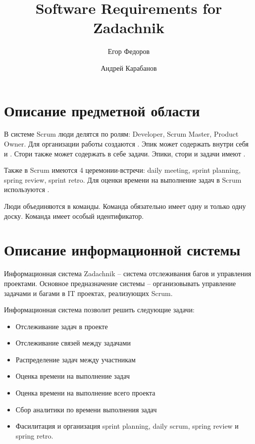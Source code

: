 \documentclass{article}
\author{Егор Федоров \and Андрей Карабанов}
\title{Software Requirements for Zadachnik}
\begin{document}

\tableofcontents

\section{Описание предметной области}
В системе Scrum люди делятся по ролям:
Developer, Scrum Master, Product Owner.
Для организации работы создаются .
Эпик может содержать внутри себя  и
. Стори также может содержать в себе задачи.
Эпики, стори и задачи имеют .

Также в Scrum имеются 4 церемонии-встречи: daily meeting, sprint
planning, spring review, sprint retro.
Для оценки времени на выполнение задач в Scrum используются .

Люди объединяются в команды. Команда обязательно имеет одну и только одну доску.
Команда имеет особый идентификатор.


\section{Описание информационной системы}
Информационная система Zadachnik -- система отслеживания багов и
управления проектами.
Основное предназначение системы -- организовывать управление задачами и багами
в IT проектах, реализующих Scrum.

Информационная система позволит решить следующие задачи:
\begin{itemize}
  \item Отслеживание задач в проекте
  \item Отслеживание связей между задачами
  \item Распределение задач между участникам
  \item Оценка времени на выполнение задач
  \item Оценка времени на выполнение всего проекта
  \item Сбор аналитики по времени выполнения задач
  \item Фасилитация и организация sprint planning, daily scrum, spring review и spring retro.
\end{itemize}
\end{document}
